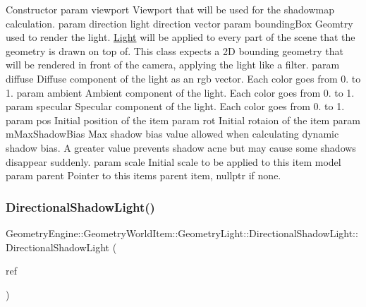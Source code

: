 Constructor param viewport Viewport that will be used for the shadowmap calculation. param direction light direction vector param bounding\+Box Geomtry used to render the light. \mbox{\hyperlink{class_geometry_engine_1_1_geometry_world_item_1_1_geometry_light_1_1_light}{Light}} will be applied to every part of the scene that the geometry is drawn on top of. This class expects a 2D bounding geometry that will be rendered in front of the camera, applying the light like a filter. param diffuse Diffuse component of the light as an rgb vector. Each color goes from 0. to 1. param ambient Ambient component of the light. Each color goes from 0. to 1. param specular Specular component of the light. Each color goes from 0. to 1. param pos Initial position of the item param rot Initial rotaion of the item param m\+Max\+Shadow\+Bias Max shadow bias value allowed when calculating dynamic shadow bias. A greater value prevents shadow acne but may cause some shadows disappear suddenly. param scale Initial scale to be applied to this item model param parent Pointer to this items parent item, nullptr if none. \mbox{\label{class_geometry_engine_1_1_geometry_world_item_1_1_geometry_light_1_1_directional_shadow_light_ad01c71215f6c7c3065f9d6dcc0ea195c}} 
\subsubsection{\texorpdfstring{DirectionalShadowLight()}{DirectionalShadowLight()}\hspace{0.1cm}{\footnotesize\ttfamily [2/2]}}
{\footnotesize\ttfamily Geometry\+Engine\+::\+Geometry\+World\+Item\+::\+Geometry\+Light\+::\+Directional\+Shadow\+Light\+::\+Directional\+Shadow\+Light (\begin{DoxyParamCaption}\item[{const \mbox{\hyperlink{class_geometry_engine_1_1_geometry_world_item_1_1_geometry_light_1_1_directional_shadow_light}{Directional\+Shadow\+Light}} \&}]{ref }\end{DoxyParamCaption})\hspace{0.3cm}{\ttfamily [inline]}}

